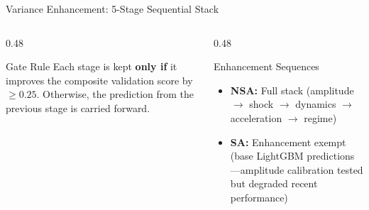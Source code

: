 \documentclass[aspectratio=169,10pt]{beamer}
\begin{document}
\begin{frame}{Variance Enhancement: 5-Stage Sequential Stack}
\vspace{0.15cm}
\begin{columns}[T]
\begin{column}{0.48\textwidth}
\begin{block}{Gate Rule}
\footnotesize
Each stage is kept \textbf{only if} it improves the composite validation score by $\ge 0.25$. Otherwise, the prediction from the previous stage is carried forward.
\end{block}
\end{column}
\begin{column}{0.48\textwidth}
\begin{block}{Enhancement Sequences}
\footnotesize
\begin{itemize}
  \item \textbf{NSA:} Full stack (amplitude $\to$ shock $\to$ dynamics $\to$ acceleration $\to$ regime)
  \item \textbf{SA:} Enhancement exempt (base LightGBM predictions---amplitude calibration tested but degraded recent performance)
\end{itemize}
\end{block}
\end{column}
\end{columns}
\end{frame}
\end{document}
